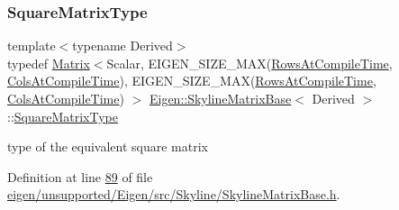 \subsubsection{\texorpdfstring{Square\+Matrix\+Type}{SquareMatrixType}\hspace{0.1cm}{\footnotesize\ttfamily [1/2]}}
{\footnotesize\ttfamily template$<$typename Derived$>$ \\
typedef \hyperlink{group___core___module_class_eigen_1_1_matrix}{Matrix}$<$Scalar, E\+I\+G\+E\+N\+\_\+\+S\+I\+Z\+E\+\_\+\+M\+AX(\hyperlink{class_eigen_1_1_skyline_matrix_base_a811ba3961cb927ae5fa84ed278ebceeaa22b71b821112b0ccf61b7317b9ac4cf4}{Rows\+At\+Compile\+Time}, \hyperlink{class_eigen_1_1_skyline_matrix_base_a811ba3961cb927ae5fa84ed278ebceeaa0bb8b9ae248b86ca53aff754311111e8}{Cols\+At\+Compile\+Time}), E\+I\+G\+E\+N\+\_\+\+S\+I\+Z\+E\+\_\+\+M\+AX(\hyperlink{class_eigen_1_1_skyline_matrix_base_a811ba3961cb927ae5fa84ed278ebceeaa22b71b821112b0ccf61b7317b9ac4cf4}{Rows\+At\+Compile\+Time}, \hyperlink{class_eigen_1_1_skyline_matrix_base_a811ba3961cb927ae5fa84ed278ebceeaa0bb8b9ae248b86ca53aff754311111e8}{Cols\+At\+Compile\+Time}) $>$ \hyperlink{class_eigen_1_1_skyline_matrix_base}{Eigen\+::\+Skyline\+Matrix\+Base}$<$ Derived $>$\+::\hyperlink{class_eigen_1_1_skyline_matrix_base_a2cc6375aec33f8ed497d1729f8888899}{Square\+Matrix\+Type}}

type of the equivalent square matrix 

Definition at line \hyperlink{eigen_2unsupported_2_eigen_2src_2_skyline_2_skyline_matrix_base_8h_source_l00089}{89} of file \hyperlink{eigen_2unsupported_2_eigen_2src_2_skyline_2_skyline_matrix_base_8h_source}{eigen/unsupported/\+Eigen/src/\+Skyline/\+Skyline\+Matrix\+Base.\+h}.

\mbox{\label{class_eigen_1_1_skyline_matrix_base_a2cc6375aec33f8ed497d1729f8888899}} 
